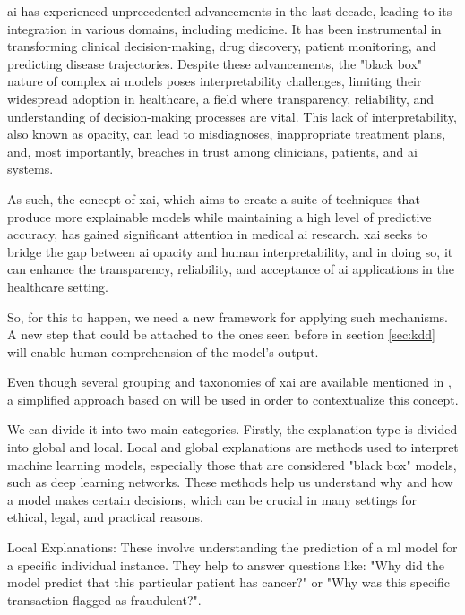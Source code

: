\ac{ai} has experienced unprecedented advancements in the last decade, leading to its integration in various domains, including medicine. It has been instrumental in transforming clinical decision-making, drug discovery, patient monitoring, and predicting disease trajectories. Despite these advancements, the "black box" nature of complex \ac{ai} models poses interpretability challenges, limiting their widespread adoption in healthcare, a field where transparency, reliability, and understanding of decision-making processes are vital. This lack of interpretability, also known as opacity, can lead to misdiagnoses, inappropriate treatment plans, and, most importantly, breaches in trust among clinicians, patients, and \ac{ai} systems.

As such, the concept of \ac{xai}, which aims to create a suite of techniques that produce more explainable models while maintaining a high level of predictive accuracy, has gained significant attention in medical \ac{ai} research. \ac{xai} seeks to bridge the gap between \ac{ai} opacity and human interpretability, and in doing so, it can enhance the transparency, reliability, and acceptance of \ac{ai} applications in the healthcare setting.

So, for this to happen, we need a new framework for applying such mechanisms. A new step that could be attached to the ones seen before in section \ref{sec:kdd} will enable human comprehension of the model's output.

Even though several grouping and taxonomies of \ac{xai} are available mentioned in \cite{adadiPeekingBlackBoxSurvey2018,linardatosExplainableAIReview2020,barredoarrietaExplainableArtificialIntelligence2020,linardatosExplainableAIReview2020,kamath2021explainable}, a simplified approach based on \cite{kamath2021explainable} will be used in order to contextualize this concept.

We can divide it into two main categories. Firstly, the explanation type is divided into global and local. Local and global explanations are methods used to interpret machine learning models, especially those that are considered "black box" models, such as deep learning networks. These methods help us understand why and how a model makes certain decisions, which can be crucial in many settings for ethical, legal, and practical reasons.

Local Explanations: These involve understanding the prediction of a \ac{ml} model for a specific individual instance. They help to answer questions like: "Why did the model predict that this particular patient has cancer?" or "Why was this specific transaction flagged as fraudulent?". 

